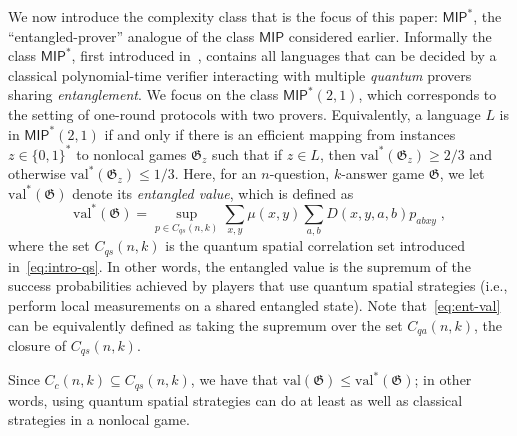\documentclass[11pt]{article}
\theoremstyle{definition}
\newcommand{\val}{\ensuremath{\mathrm{val}}}
\newcommand{\game}{\mathfrak{G}}
\newcommand{\class}[1]{\ensuremath{\mathsf{#1}}\xspace}
\newcommand{\MIP}{\class{MIP}} %
\begin{document}
We now introduce the complexity class that is the focus of this paper: $\MIP^*$, the ``entangled-prover'' analogue of the class $\MIP$ considered earlier. Informally the class $\MIP^*$, first introduced in~\cite{cleve2004consequences}, contains all languages that can be decided by a classical polynomial-time verifier interacting with multiple \emph{quantum} provers sharing \emph{entanglement}. We focus on the class $\MIP^*(2,1)$, which corresponds to the setting of one-round protocols with two  provers. Equivalently, a language $L$ is in $\MIP^*(2,1)$ if and only if there is an efficient mapping from instances $z\in\{0,1\}^*$ to nonlocal games $\game_z$ such that if $z \in L$, then $\val^*(\game_z) \geq 2/3$ and otherwise $\val^*(\game_z) \leq 1/3$. Here, for an $n$-question, $k$-answer game $\game$, we let $\val^*(\game)$ denote its \emph{entangled value}, which is defined as
\begin{equation}\label{eq:ent-val}
 \val^*(\game) = \sup_{p\in C_{qs}(n,k)} \sum_{x,y} \mu(x,y) \sum_{a,b} D(x,y,a,b) p_{abxy}\;,
\end{equation}
where the set $C_{qs}(n,k)$ is the quantum spatial correlation set introduced in~\eqref{eq:intro-qs}. In other words, the entangled value is the supremum of the success probabilities achieved by players that use quantum spatial strategies (i.e., perform local measurements on a shared entangled state). Note that~\eqref{eq:ent-val} can be equivalently defined as taking the supremum  over the set $C_{qa}(n,k)$, the closure of $C_{qs}(n,k)$.

Since $C_c(n,k) \subseteq C_{qs}(n,k)$, we have that $\val(\game) \leq \val^*(\game)$; in other words, using quantum spatial strategies can do at least as well as classical strategies in a nonlocal game. 

\end{document}
